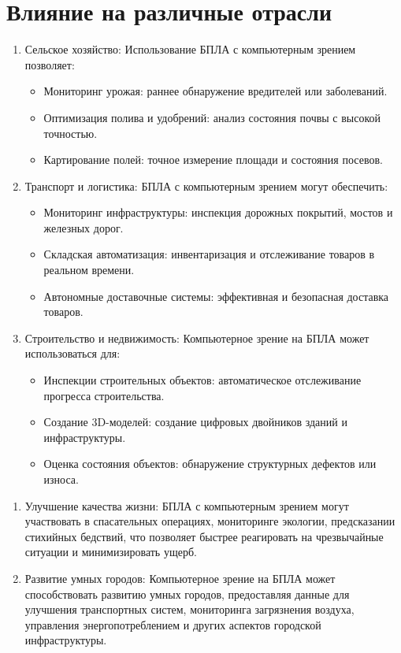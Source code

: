     \section*{Влияние на различные отрасли}
    \begin{enumerate}
        \item Сельское хозяйство:
        Использование БПЛА с компьютерным зрением позволяет:
        \begin{itemize}
            \item Мониторинг урожая: раннее обнаружение вредителей или заболеваний.
            \item Оптимизация полива и удобрений: анализ состояния почвы с высокой точностью.
            \item Картирование полей: точное измерение площади и состояния посевов.
        \end{itemize}
        
        \item Транспорт и логистика:
        БПЛА с компьютерным зрением могут обеспечить:
        \begin{itemize}
            \item Мониторинг инфраструктуры: инспекция дорожных покрытий, мостов и железных дорог.
            \item Складская автоматизация: инвентаризация и отслеживание товаров в реальном времени.
            \item Автономные доставочные системы: эффективная и безопасная доставка товаров.
        \end{itemize}
        
        \item Строительство и недвижимость:
        Компьютерное зрение на БПЛА может использоваться для:
        \begin{itemize}
            \item Инспекции строительных объектов: автоматическое отслеживание прогресса строительства.
            \item Создание 3D-моделей: создание цифровых двойников зданий и инфраструктуры.
            \item Оценка состояния объектов: обнаружение структурных дефектов или износа.
        \end{itemize}
    \end{enumerate}
    
    \begin{enumerate}
        \item Улучшение качества жизни:
        БПЛА с компьютерным зрением могут участвовать в спасательных операциях, мониторинге экологии, предсказании стихийных бедствий, что позволяет быстрее реагировать на чрезвычайные ситуации и минимизировать ущерб.
        
        \item Развитие умных городов:
        Компьютерное зрение на БПЛА может способствовать развитию умных городов, предоставляя данные для улучшения транспортных систем, мониторинга загрязнения воздуха, управления энергопотреблением и других аспектов городской инфраструктуры.
    \end{enumerate}
    
